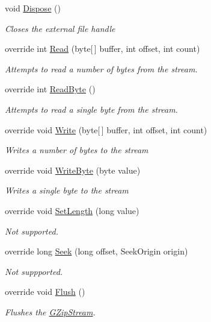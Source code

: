 \begin{DoxyCompactItemize}
void \hyperlink{class_dot_z_lib_1_1_g_zip_stream_a1fab7340250fa883c12ab08502826d07}{Dispose} ()
\begin{DoxyCompactList}\small\item\em Closes the external file handle \end{DoxyCompactList}\item 
override int \hyperlink{class_dot_z_lib_1_1_g_zip_stream_a7f08839f681ed2eec9e3a87a0f1b0b0b}{Read} (byte\mbox{[}$\,$\mbox{]} buffer, int offset, int count)
\begin{DoxyCompactList}\small\item\em Attempts to read a number of bytes from the stream. \end{DoxyCompactList}\item 
override int \hyperlink{class_dot_z_lib_1_1_g_zip_stream_aedb91212e360ab574bca4745e2189201}{Read\+Byte} ()
\begin{DoxyCompactList}\small\item\em Attempts to read a single byte from the stream. \end{DoxyCompactList}\item 
override void \hyperlink{class_dot_z_lib_1_1_g_zip_stream_a844fcf0ab29c0bf26591e206669d485d}{Write} (byte\mbox{[}$\,$\mbox{]} buffer, int offset, int count)
\begin{DoxyCompactList}\small\item\em Writes a number of bytes to the stream \end{DoxyCompactList}\item 
override void \hyperlink{class_dot_z_lib_1_1_g_zip_stream_a78b38035956f42bf1c66db34ec2ba2cc}{Write\+Byte} (byte value)
\begin{DoxyCompactList}\small\item\em Writes a single byte to the stream \end{DoxyCompactList}\item 
override void \hyperlink{class_dot_z_lib_1_1_g_zip_stream_a05fff98b765251f87b41318781da71c4}{Set\+Length} (long value)
\begin{DoxyCompactList}\small\item\em Not supported. \end{DoxyCompactList}\item 
override long \hyperlink{class_dot_z_lib_1_1_g_zip_stream_adbb50684c05ca060cff804c91c63f4a2}{Seek} (long offset, Seek\+Origin origin)
\begin{DoxyCompactList}\small\item\em Not suppported. \end{DoxyCompactList}\item 
override void \hyperlink{class_dot_z_lib_1_1_g_zip_stream_a1e219fd4cc6c0f3c3bbd373f9724e24e}{Flush} ()
\begin{DoxyCompactList}\small\item\em Flushes the {\ttfamily \hyperlink{class_dot_z_lib_1_1_g_zip_stream}{G\+Zip\+Stream}}. \end{DoxyCompactList}\end{DoxyCompactItemize}
